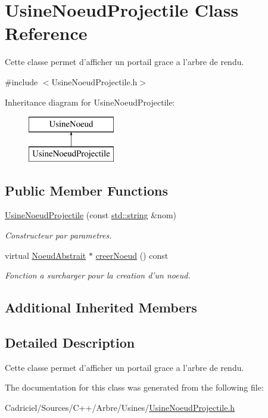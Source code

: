 \hypertarget{class_usine_noeud_projectile}{\section{Usine\-Noeud\-Projectile Class Reference}
\label{class_usine_noeud_projectile}
}


Cette classe permet d'afficher un portail grace a l'arbre de rendu.  




{\ttfamily \#include $<$Usine\-Noeud\-Projectile.\-h$>$}

Inheritance diagram for Usine\-Noeud\-Projectile\-:\begin{figure}[H]
\begin{center}
\leavevmode
\includegraphics[height=2.000000cm]{class_usine_noeud_projectile}
\end{center}
\end{figure}
\subsection*{Public Member Functions}
\begin{DoxyCompactItemize}
\item 
\hyperlink{group__inf2990_gaa99dfe6188de9eb3f79824d8c5fed24c}{Usine\-Noeud\-Projectile} (const \hyperlink{glew_8h_ae84541b4f3d8e1ea24ec0f466a8c568b}{std\-::string} \&nom)
\begin{DoxyCompactList}\small\item\em Constructeur par parametres. \end{DoxyCompactList}\item 
virtual \hyperlink{class_noeud_abstrait}{Noeud\-Abstrait} $\ast$ \hyperlink{group__inf2990_ga1e14780d2df909be0a7cf5c6b64897bd}{creer\-Noeud} () const 
\begin{DoxyCompactList}\small\item\em Fonction a surcharger pour la creation d'un noeud. \end{DoxyCompactList}\end{DoxyCompactItemize}
\subsection*{Additional Inherited Members}


\subsection{Detailed Description}
Cette classe permet d'afficher un portail grace a l'arbre de rendu. 

The documentation for this class was generated from the following file\-:\begin{DoxyCompactItemize}
\item 
Cadriciel/\-Sources/\-C++/\-Arbre/\-Usines/\hyperlink{_usine_noeud_projectile_8h}{Usine\-Noeud\-Projectile.\-h}\end{DoxyCompactItemize}
